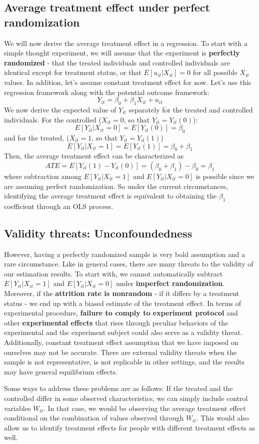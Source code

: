 \documentclass[12pt]{article}
\theoremstyle{definition}
\theoremstyle{property}
\theoremstyle{assumption}
\theoremstyle{example}
\theoremstyle{comment}
\begin{document}
\subsection{Average treatment effect under perfect randomization}
We will now derive the average treatment effect in a regression. To start with a simple thought experiment, we will assume that the experiment is \textbf{perfectly randomized} - that the treated individuals and controlled individuals are identical except for treatment status, or that $E[u_{it}|X_{it}]=0$ for all possible $X_{it}$ values. In addition, let's assume constant treatment effect for now. Let's use this regression framework along with the potential outcome framework:
\[
Y_{it} = \beta_0 + \beta_1 X_{it}+u_{it}
\] 
We now derive the expected value of $Y_{it}$ separately for the treated and controlled individuals. For the controlled ($X_{it}=0$, so that $Y_{it}=Y_{it}(0)$):
\[
E[Y_{it}|X_{it}=0]=E[Y_{it}(0)]=\beta_0
\]
and for the treated, ($X_{it}=1$, so that $Y_{it}=Y_{it}(1)$)
\[
E[Y_{it}|X_{it}=1]=E[Y_{it}(1)]=\beta_0+\beta_1
\]
Then, the average treatment effect can be characterized as
\[
ATE = E[Y_{it}(1)-Y_{it}(0)]=(\beta_0+\beta_1)-\beta_0=\beta_1
\]
where subtraction among $E[Y_{it}|X_{it}=1]$ and $E[Y_{it}|X_{it}=0]$ is possible since we are assuming perfect randomization. So under the current circumstances, identifying the average treatment effect is equivalent to obtaining the $\beta_1$ coefficient through an OLS process.
\par\medskip


\subsection{Validity threats: Unconfoundedness}
However, having a perfectly randomized sample is very bold assumption and a rare circumstance. Like in general cases, there are many threats to the validity of our estimation results. To start with, we cannot automatically subtract $E[Y_{it}|X_{it}=1]$ and $E[Y_{it}|X_{it}=0]$ under \textbf{imperfect randomization}. Moreover, if the \textbf{attrition rate is nonrandom} - if it differs by a treatment status - we end up with a biased estimate of the treatment effect. In terms of experimental procedure, \textbf{failure to comply to experiment protocol} and other \textbf{experimental effects} that rises through peculiar behaviors of the experimental and the experiment subject could also serve as a validity threat. Additionally, constant treatment effect assumption that we have imposed on ourselves may not be accurate. There are external validity threats when the sample is not representative, is not replicable in other settings, and the results may have general equilibrium effects.
\par\medskip
Some ways to address these problems are as follows: If the treated and the controlled differ in some observed characteristics, we can simply include control variables $W_{it}$.  In that case, we would be observing the average treatment effect conditional on the combination of values observed through $W_{it}$. This would also allow us to identify treatment effects for people with different treatment effects as well. 
\par\medskip
\end{document}
